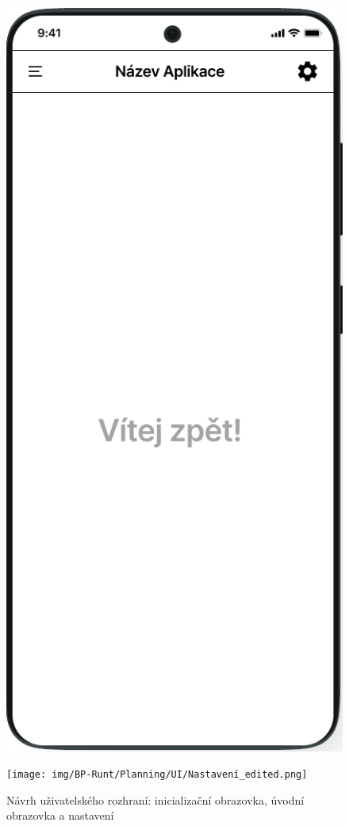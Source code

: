 \documentclass[czech, bc, kiv, he, iso690numb]{fasthesis}
\begin{document}
\begin{figure}[h!]
\begin{minipage}[h]{0.30\textwidth}
  \end{minipage}
  \hfill
  \begin{minipage}[h]{0.30\textwidth}
    \includegraphics[width=\textwidth]{img/BP-Runt/Planning/UI/Home Screen_edited.png}
  \end{minipage}
  \hfill
  \begin{minipage}[h]{0.30\textwidth}
    \texttt{[image: img/BP-Runt/Planning/UI/Nastavení\_edited.png]}
  \end{minipage}
  \caption{Návrh uživatelského rozhraní: inicializační obrazovka, úvodní obrazovka a nastavení}
  \label{fig:planning_UI_1}
\end{figure}
\end{document}

